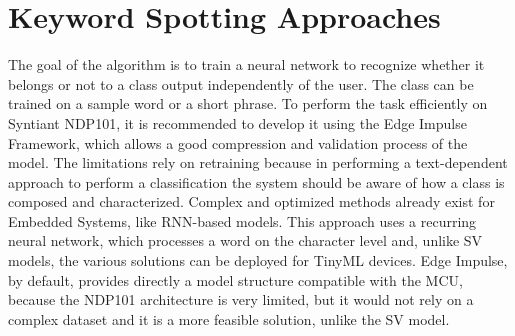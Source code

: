 \section{Keyword Spotting Approaches}
\label{subsec:kws approaches}
The goal of the algorithm is to train a neural network to recognize whether it belongs or not to a class output independently of the user. The class can be trained on a sample word or a short phrase. To perform the task efficiently on Syntiant NDP101, it is recommended to develop it using the Edge Impulse Framework, which allows a good compression and validation process of the model. The limitations rely on retraining because in performing a text-dependent approach to perform a classification the system should be aware of how a class is composed and characterized. Complex and optimized methods already exist for Embedded Systems, like RNN-based models. This approach uses a recurring neural network\cite{kws_rnn_based}, which processes a word on the character level and, unlike SV models, the various solutions can be deployed for TinyML devices. Edge Impulse, by default, provides directly a model structure compatible with the MCU, because the NDP101 architecture is very limited, but it would not rely on a complex dataset and it is a more feasible solution, unlike the SV model.

\newpage